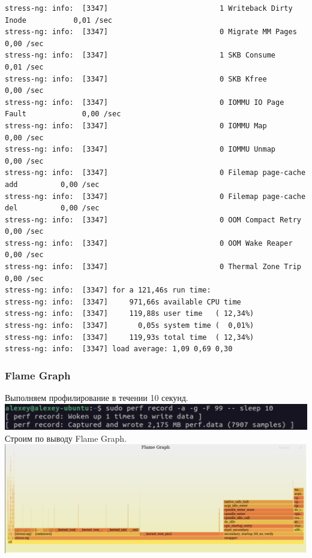 \documentclass[12pt,onecolumn]{article}
\begin{document}
{\begin{lstlisting}
stress-ng: info:  [3347]                          1 Writeback Dirty Inode           0,01 /sec 
stress-ng: info:  [3347]                          0 Migrate MM Pages                0,00 /sec 
stress-ng: info:  [3347]                          1 SKB Consume                     0,01 /sec 
stress-ng: info:  [3347]                          0 SKB Kfree                       0,00 /sec 
stress-ng: info:  [3347]                          0 IOMMU IO Page Fault             0,00 /sec 
stress-ng: info:  [3347]                          0 IOMMU Map                       0,00 /sec 
stress-ng: info:  [3347]                          0 IOMMU Unmap                     0,00 /sec 
stress-ng: info:  [3347]                          0 Filemap page-cache add          0,00 /sec 
stress-ng: info:  [3347]                          0 Filemap page-cache del          0,00 /sec 
stress-ng: info:  [3347]                          0 OOM Compact Retry               0,00 /sec 
stress-ng: info:  [3347]                          0 OOM Wake Reaper                 0,00 /sec 
stress-ng: info:  [3347]                          0 Thermal Zone Trip               0,00 /sec 
stress-ng: info:  [3347] for a 121,46s run time:
stress-ng: info:  [3347]     971,66s available CPU time
stress-ng: info:  [3347]     119,88s user time   ( 12,34%)
stress-ng: info:  [3347]       0,05s system time (  0,01%)
stress-ng: info:  [3347]     119,93s total time  ( 12,34%)
stress-ng: info:  [3347] load average: 1,09 0,69 0,30
\end{lstlisting}}
\subsubsection{Flame Graph}
Выполняем профилирование в течении 10 секунд.\\
\includegraphics[width=\textwidth]{image/perf.png}
Строим по выводу Flame Graph.\\
\includegraphics[width=\textwidth]{image/flamegraph.png}
\end{document}
